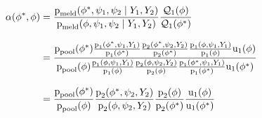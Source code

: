 \begin{align}
 \alpha(\phi^{*}, \phi) 
  &= 
    \frac {
      \text{p}_{\text{meld}}(\phi^{*}, \psi_{1}, \psi_{2} \mid Y_{1}, Y_{2})
    } {
      \text{p}_{\text{meld}}(\phi, \psi_{1}, \psi_{2} \mid Y_{1}, Y_{2})
    }
    \frac {
      \mathcal{Q}_{1}(\phi)
    } {
      \mathcal{Q}_{1}(\phi^{*})
    } \\[2ex]
  &=
    \frac {
      \text{p}_{\text{pool}}(\phi^{*})
      \frac {
        \text{p}_{1}(\phi^{*}, \psi_1, Y_{1})
      } {
        \text{p}_{1}(\phi^{*})
      }
      \frac {
        \text{p}_{2}(\phi^{*}, \psi_2, Y_{2})
      } {
        \text{p}_{2}(\phi^{*})
      }
      \frac {
        \text{p}_{1}(\phi, \psi_1, Y_{1})
      } {
        \text{p}_{1}(\phi)
      }
      \text{u}_{1}(\phi)
    } {
      \text{p}_{\text{pool}}(\phi)
      \frac {
        \text{p}_{1}(\phi, \psi_1, Y_{1})
      } {
        \text{p}_{1}(\phi)
      }
      \frac {
        \text{p}_{2}(\phi, \psi_2, Y_{2})
      } {
        \text{p}_{2}(\phi)
      }
      \frac {
        \text{p}_{1}(\phi^{*}, \psi_1, Y_{1})
      } {
        \text{p}_{1}(\phi^{*})
      }
      \text{u}_{1}(\phi^{*})
    } \\[2ex]
  &= 
    \frac{
      \text{p}_{\text{pool}} (\phi^{*})
    } {
      \text{p}_{\text{pool}} (\phi)
    }
    \frac {
      \text{p}_{2}(\phi^{*}, \psi_2, Y_{2})
    } {
      \text{p}_{2}(\phi, \psi_2, Y_{2})
    }
    \frac {
      \text{p}_{2}(\phi)
    } {
      \text{p}_{2}(\phi^{*})
    }
    \frac {
      \text{u}_{1}(\phi)
    } {
      \text{u}_{1}(\phi^{*})
    }
  \label{eqn:stage-two-acceptance}
\end{align}